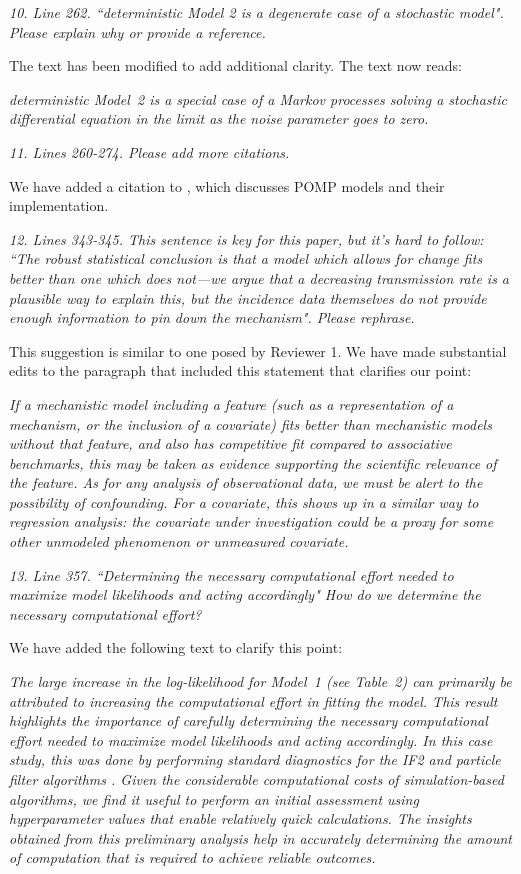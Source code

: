 \documentclass[11pt]{article}
\newcommand\report[1]{{\color{mygreen} \vspace{1mm}\hspace{0.25in}\parbox{6in}{\em #1}}}
\newcommand\article[1]{{\color{blue} \vspace{1mm}\hspace{0.25in}\parbox{6in}{\em #1}}}
\begin{document}
\report{
  10. Line 262. ``deterministic Model 2 is a degenerate case of a stochastic model". Please explain why or provide a reference.
}

The text has been modified to add additional clarity. The text now reads:

\article{deterministic Model~2 is a special case of a Markov processes solving a stochastic differential equation in the limit as the noise parameter goes to zero.}

\report{
  11. Lines 260-274. Please add more citations.
}

We have added a citation to \cite{king16}, which discusses POMP models and their implementation.

\report{
  12. Lines 343-345. This sentence is key for this paper, but it’s hard to follow: ``The robust statistical conclusion is that a model which allows for change fits better than one which does not—we argue that a decreasing transmission rate is a plausible way to explain this, but the incidence data themselves do not provide enough information to pin down the mechanism". Please rephrase.
}

This suggestion is similar to one posed by Reviewer 1. We have made substantial edits to the paragraph that included this statement that clarifies our point:

\article{If a mechanistic model including a feature (such as a representation of a mechanism, or the inclusion of a covariate) fits better than mechanistic models without that feature, and also has competitive fit compared to associative benchmarks, this may be taken as evidence supporting the scientific relevance of the feature.
As for any analysis of observational data, we must be alert to the possibility of confounding.
For a covariate, this shows up in a similar way to regression analysis: the covariate under investigation could be a proxy for some other unmodeled phenomenon or unmeasured covariate.}

\article{\editConfound}

\report{
  13. Line 357. ``Determining the necessary computational effort needed to maximize model likelihoods and acting accordingly" How do we determine the necessary computational effort?
}

We have added the following text to clarify this point:

\article{The large increase in the log-likelihood for Model~1 (see Table~2) can primarily be attributed to increasing the computational effort in fitting the model.
This result highlights the importance of carefully determining the necessary computational effort needed to maximize model likelihoods and acting accordingly.
In this case study, this was done by performing standard diagnostics for the IF2 and particle filter algorithms \cite{king16}. Given the considerable computational costs of simulation-based algorithms, we find it useful to perform an initial assessment using hyperparameter values that enable relatively quick calculations. The insights obtained from this preliminary analysis help in accurately determining the amount of computation that is required to achieve reliable outcomes.}
\end{document}
